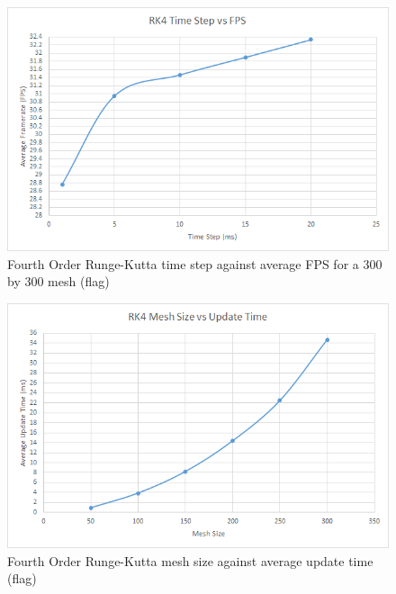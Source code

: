     \begin{figure}
    \begin{center}
      \includegraphics[scale=.9]{Figures/flag_rk4_ts_fps}
    \end{center}
    \caption{Fourth Order Runge-Kutta time step against average FPS for a 300 by 300 mesh (flag)}
    \label{fig:rk4 step fps flag}
  \end{figure}
  
    \begin{figure}
    \begin{center}
      \includegraphics[scale=.9]{Figures/flag_rk4_m_ut}
    \end{center}
    \caption{Fourth Order Runge-Kutta mesh size against average update time (flag)}
    \label{fig:rk4 mesh update flag}
  \end{figure}
  
